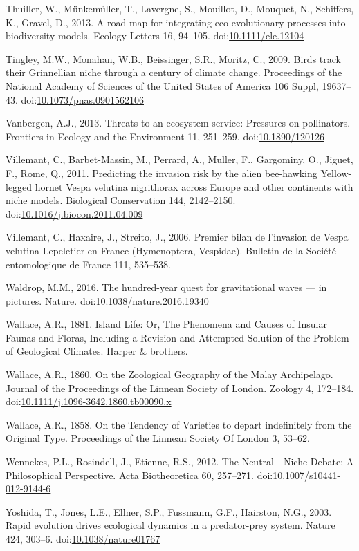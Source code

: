 \hypertarget{ref-Thuiller2013}{}
Thuiller, W., Münkemüller, T., Lavergne, S., Mouillot, D., Mouquet, N.,
Schiffers, K., Gravel, D., 2013. A road map for integrating
eco-evolutionary processes into biodiversity models. Ecology Letters 16,
94--105. doi:\href{https://doi.org/10.1111/ele.12104}{10.1111/ele.12104}

\hypertarget{ref-Tingley2009}{}
Tingley, M.W., Monahan, W.B., Beissinger, S.R., Moritz, C., 2009. Birds
track their Grinnellian niche through a century of climate change.
Proceedings of the National Academy of Sciences of the United States of
America 106 Suppl, 19637--43.
doi:\href{https://doi.org/10.1073/pnas.0901562106}{10.1073/pnas.0901562106}

\hypertarget{ref-Vanbergen2013}{}
Vanbergen, A.J., 2013. Threats to an ecosystem service: Pressures on
pollinators. Frontiers in Ecology and the Environment 11, 251--259.
doi:\href{https://doi.org/10.1890/120126}{10.1890/120126}

\hypertarget{ref-Villemant2011}{}
Villemant, C., Barbet-Massin, M., Perrard, A., Muller, F., Gargominy,
O., Jiguet, F., Rome, Q., 2011. Predicting the invasion risk by the
alien bee-hawking Yellow-legged hornet Vespa velutina nigrithorax across
Europe and other continents with niche models. Biological Conservation
144, 2142--2150.
doi:\href{https://doi.org/10.1016/j.biocon.2011.04.009}{10.1016/j.biocon.2011.04.009}

\hypertarget{ref-Villemant2006}{}
Villemant, C., Haxaire, J., Streito, J., 2006. Premier bilan de
l'invasion de Vespa velutina Lepeletier en France (Hymenoptera,
Vespidae). Bulletin de la Société entomologique de France 111, 535--538.

\hypertarget{ref-Waldrop2016}{}
Waldrop, M.M., 2016. The hundred-year quest for gravitational waves ---
in pictures. Nature.
doi:\href{https://doi.org/10.1038/nature.2016.19340}{10.1038/nature.2016.19340}

\hypertarget{ref-wallace1881island}{}
Wallace, A.R., 1881. Island Life: Or, The Phenomena and Causes of
Insular Faunas and Floras, Including a Revision and Attempted Solution
of the Problem of Geological Climates. Harper \& brothers.

\hypertarget{ref-Wallace1860}{}
Wallace, A.R., 1860. On the Zoological Geography of the Malay
Archipelago. Journal of the Proceedings of the Linnean Society of
London. Zoology 4, 172--184.
doi:\href{https://doi.org/10.1111/j.1096-3642.1860.tb00090.x}{10.1111/j.1096-3642.1860.tb00090.x}

\hypertarget{ref-Wallace1858}{}
Wallace, A.R., 1858. On the Tendency of Varieties to depart indefinitely
from the Original Type. Proceedings of the Linnean Society Of London 3,
53--62.

\hypertarget{ref-Wennekes2012}{}
Wennekes, P.L., Rosindell, J., Etienne, R.S., 2012. The Neutral---Niche
Debate: A Philosophical Perspective. Acta Biotheoretica 60, 257--271.
doi:\href{https://doi.org/10.1007/s10441-012-9144-6}{10.1007/s10441-012-9144-6}

\hypertarget{ref-Yoshida2003}{}
Yoshida, T., Jones, L.E., Ellner, S.P., Fussmann, G.F., Hairston, N.G.,
2003. Rapid evolution drives ecological dynamics in a predator-prey
system. Nature 424, 303--6.
doi:\href{https://doi.org/10.1038/nature01767}{10.1038/nature01767}
